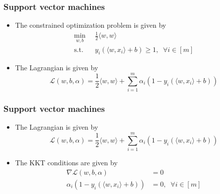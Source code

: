 \documentclass[10pt]{beamer}
\begin{document}
\begin{frame}
  \frametitle{Support vector machines}
  \begin{itemize}
  \item The constrained optimization problem is given by
  \begin{align*}
	\min_{w,b} \;\; & \frac 1 2 \langle w, w \rangle\\
	\mathrm{s.t.} \;\; & y_i(\langle w, x_i\rangle + b) \geq 1, \;\; \forall i\in[m]
  \end{align*}
  \pause
  \item The Lagrangian is given by
  \[\mathcal{L}(w,b,\alpha) = \frac 1 2 \langle w, w \rangle + \sum_{i=1}^m \alpha_i (1 - y_i(\langle w, x_i\rangle + b))\]
  \end{itemize}
\end{frame}

\begin{frame}
  \frametitle{Support vector machines}
  \begin{itemize}
  \item The Lagrangian is given by
  \[\mathcal{L}(w,b,\alpha) = \frac 1 2 \langle w, w \rangle + \sum_{i=1}^m \alpha_i (1 - y_i(\langle w, x_i\rangle + b))\]
  \pause
  \item The KKT conditions are given by
  \begin{align*}
	\nabla\mathcal{L}(w,b,\alpha) &= 0\\
	\alpha_i (1 - y_i(\langle w, x_i\rangle + b)) &= 0, \;\; \forall i\in[m]
  \end{align*}
  \end{itemize}
\end{frame}
\end{document}

